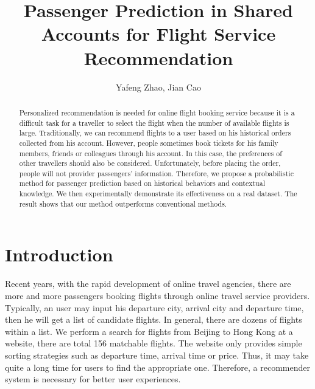 \documentclass{llncs}
\begin{document}
\title{Passenger Prediction in Shared Accounts for Flight Service Recommendation}

%


\author{Yafeng Zhao, Jian Cao}


\maketitle
\begin{abstract}
Personalized recommendation is needed for online flight booking service because it is a difficult task for a traveller to select the flight when the number of available flights is large. Traditionally, we can recommend flights to a user based on his historical orders collected from his account. However, people sometimes book tickets for his family members, friends or colleagues through his account. In this case, the preferences of other travellers should also be considered. Unfortunately, before placing the order, people will not provider passengers' information. Therefore, we propose a probabilistic method for passenger prediction based on historical behaviors and contextual knowledge. We then experimentally demonstrate its effectiveness on a real dataset. The result shows that our method outperforms conventional methods.\\
\end{abstract}


\section{Introduction}
\label{sec:intro}
Recent years, with the rapid development of online travel agencies, there are more and more passengers booking flights through online travel service providers. Typically, an user may input his departure city, arrival city and departure time, then he will get a list of candidate flights. In general, there are dozens of flights within a list. We perform a search for flights from Beijing to Hong Kong at a website, there are total 156 matchable flights. The website only provides simple sorting strategies such as departure time, arrival time or price. Thus, it may take quite a long time for users to find the appropriate one. Therefore, a recommender system is necessary for better user experiences.
\end{document}
